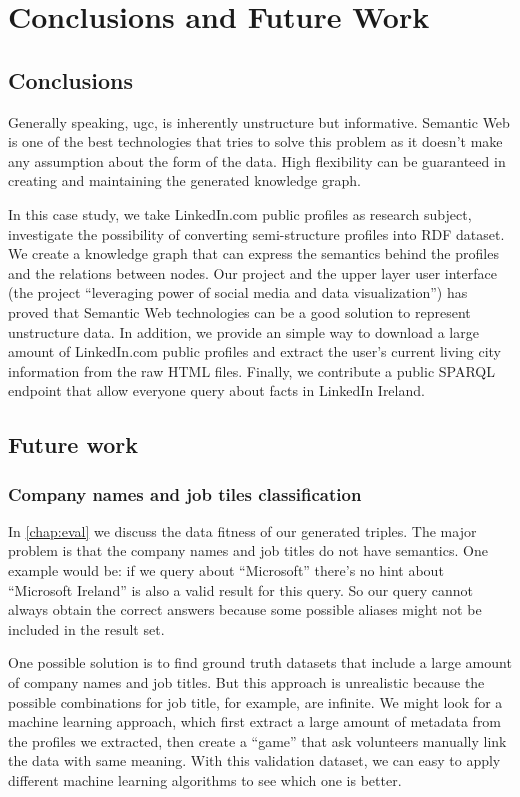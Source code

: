 \chapter{Conclusions and Future Work}

\section{Conclusions}
Generally speaking, \gls{ugc}, is inherently unstructure but informative. Semantic Web is one of the best technologies that tries to solve this problem as it doesn't make any assumption about the form of the data. High flexibility can be guaranteed in creating and maintaining the generated knowledge graph. 

In this case study, we take LinkedIn.com public profiles as research subject, investigate the possibility of converting semi-structure profiles into RDF dataset. We create a knowledge graph that can express the semantics behind the profiles and the relations between nodes. Our project and the upper layer user interface (the project ``leveraging power of social media and data visualization'') has proved that Semantic Web technologies can be a good solution to represent unstructure data. In addition, we provide an simple way to download a large amount of LinkedIn.com public profiles and extract the user's current living city information from the raw HTML files. Finally, we contribute a public SPARQL endpoint that allow everyone query about facts in LinkedIn Ireland.

\section{Future work}
\subsection{Company names and job tiles classification}
In \autoref{chap:eval} we discuss the data fitness of our generated triples. The major problem is that the company names and job titles do not have semantics. One example would be: if we query about ``Microsoft'' there's no hint about ``Microsoft Ireland'' is also a valid result for this query. So our query cannot always obtain the correct answers because some possible aliases might not be included in the result set.

One possible solution is to find ground truth datasets that include a large amount of company names and job titles. But this approach is unrealistic because the possible combinations for job title, for example, are infinite. We might look for a machine learning approach, which first extract a large amount of metadata from the profiles we extracted, then create a ``game'' that ask volunteers manually link the data with same meaning. With this validation dataset, we can easy to apply different machine learning algorithms to see which one is better.

